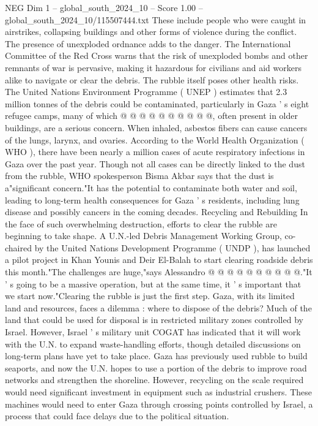 \begin{textsample}{NEG Dim 1 – global\_south\_2024\_10 – Score 1.00 – global\_south\_2024\_10/115507444.txt}
These include people who were caught in airstrikes, collapsing buildings and other forms of violence during the conflict.
The presence of unexploded ordnance adds to the danger.
The International Committee of the Red Cross warns that the risk of unexploded bombs and other remnants of war is pervasive, making it hazardous for civilians and aid workers alike to navigate or clear the debris.
The rubble itself poses other health risks.
The United Nations Environment Programme ( UNEP ) estimates that 2.3 million tonnes of the debris could be contaminated, particularly in Gaza ' s eight refugee camps, many of which @ @ @ @ @ @ @ @ @ @, often present in older buildings, are a serious concern.
When inhaled, asbestos fibers can cause cancers of the lungs, larynx, and ovaries.
According to the World Health Organization ( WHO ), there have been nearly a million cases of acute respiratory infections in Gaza over the past year.
Though not all cases can be directly linked to the dust from the rubble, WHO spokesperson Bisma Akbar says that the dust is a"significant concern."It has the potential to contaminate both water and soil, leading to long-term health consequences for Gaza ' s residents, including lung disease and possibly cancers in the coming decades.
Recycling and Rebuilding In the face of such overwhelming destruction, efforts to clear the rubble are beginning to take shape.
A U.N.-led Debris Management Working Group, co-chaired by the United Nations Development Programme ( UNDP ), has launched a pilot project in Khan Younis and Deir El-Balah to start clearing roadside debris this month."The challenges are huge,"says Alessandro @ @ @ @ @ @ @ @ @ @."It ' s going to be a massive operation, but at the same time, it ' s important that we start now."Clearing the rubble is just the first step.
Gaza, with its limited land and resources, faces a dilemma : where to dispose of the debris?
Much of the land that could be used for disposal is in restricted military zones controlled by Israel.
However, Israel ' s military unit COGAT has indicated that it will work with the U.N. to expand waste-handling efforts, though detailed discussions on long-term plans have yet to take place.
Gaza has previously used rubble to build seaports, and now the U.N. hopes to use a portion of the debris to improve road networks and strengthen the shoreline.
However, recycling on the scale required would need significant investment in equipment such as industrial crushers.
These machines would need to enter Gaza through crossing points controlled by Israel, a process that could face delays due to the political situation.

\end{textsample}
